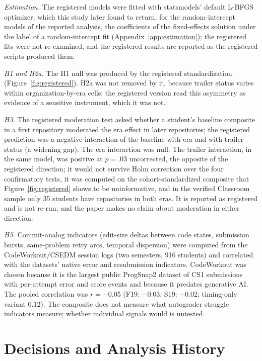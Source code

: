 \documentclass[acmsmall,screen,review,anonymous]{acmart}
\begin{document}
\textit{Estimation.} The registered models were fitted with statsmodels' default L-BFGS optimizer, which this study later found to return, for the random-intercept models of the reported analysis, the coefficients of the fixed-effects solution under the label of a random-intercept fit (Appendix~\ref{app:estimation}); the registered fits were not re-examined, and the registered results are reported as the registered scripts produced them.

\textit{H1 and H2a.} The H1 null was produced by the registered standardization (Figure~\ref{fig:registered}). H2a was not removed by it, because trailer status varies within organization-by-era cells; the registered version read this asymmetry as evidence of a sensitive instrument, which it was not.

\textit{H3.} The registered moderation test asked whether a student's baseline composite in a first repository moderated the era effect in later repositories; the registered prediction was a negative interaction of the baseline with era and with trailer status (a widening gap). The era interaction was null. The trailer interaction, in the same model, was positive at $p = .03$ uncorrected, the opposite of the registered direction; it would not survive Holm correction over the four confirmatory tests, it was computed on the cohort-standardized composite that Figure~\ref{fig:registered} shows to be uninformative, and in the verified Classroom sample only 35 students have repositories in both eras. It is reported as registered and is not re-run, and the paper makes no claim about moderation in either direction.

\textit{H5.} Commit-analog indicators (edit-size deltas between code states, submission bursts, same-problem retry arcs, temporal dispersion) were computed from the CodeWorkout/\allowbreak CSEDM session logs \citep{codeworkout2020dataset} (two semesters, 916 students) and correlated with the datasets' native error and resubmission indicators. CodeWorkout was chosen because it is the largest public ProgSnap2 dataset of CS1 submissions with per-attempt error and score events and because it predates generative AI. The pooled correlation was $r = -0.05$ (F19: $-0.03$; S19: $-0.02$; timing-only variant $0.12$). The composite does not measure what autograder struggle indicators measure; whether individual signals would is untested.

\section{Decisions and Analysis History}
\label{app:history}
\label{app:decisions}
\end{document}

